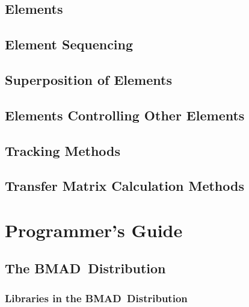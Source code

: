 \documentclass{book}
\newcommand{\bmad}{{\bf BMAD}}
\begin{document}
\chapter{Elements}

\chapter{Element Sequencing}

\chapter{Superposition of Elements}

\chapter{Elements Controlling Other Elements}

\chapter{Tracking Methods}

\chapter{Transfer Matrix Calculation Methods}

\part{Programmer's Guide}

\chapter{The \bmad\ Distribution}

\section{Libraries in the \bmad\ Distribution}
\end{document}
